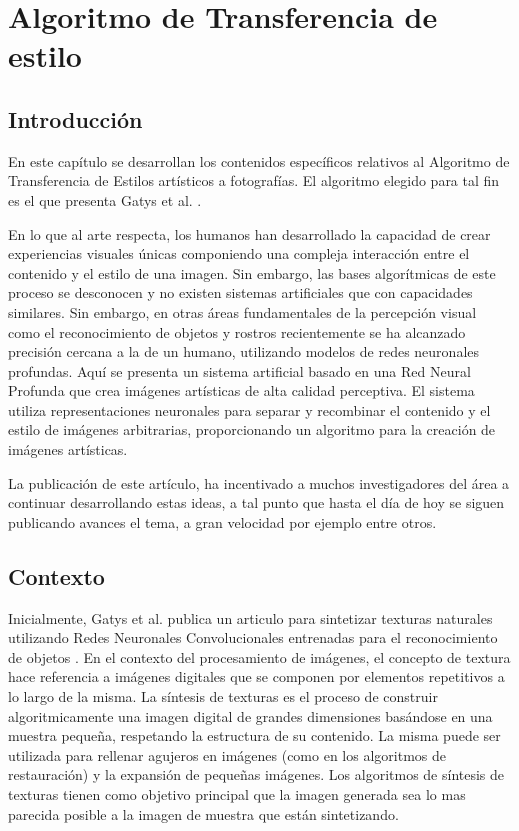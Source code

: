 \documentclass[a4paper,11pt,spanish]{book}
\begin{document}
\chapter{Algoritmo de Transferencia de estilo} \label{chapter:style_transfer}
    \section{Introducción}
      En este capítulo se desarrollan los contenidos específicos relativos al Algoritmo de Transferencia de Estilos artísticos a fotografías. 
      El algoritmo elegido para tal fin es el que presenta Gatys et al. \cite{Gatys:Neural_Style}. 
      
      En lo que al arte respecta, los humanos han desarrollado la capacidad de crear experiencias visuales únicas componiendo una compleja interacción entre el contenido y el estilo de una imagen.
      Sin embargo, las bases algorítmicas de este proceso se desconocen y no existen sistemas artificiales que con capacidades similares. Sin embargo, en otras áreas fundamentales
      de la percepción visual como el reconocimiento de objetos y rostros recientemente se ha alcanzado precisión cercana a la de un humano, utilizando modelos de redes neuronales profundas.
      Aquí se presenta un sistema artificial basado en una Red Neural Profunda que crea imágenes artísticas de alta calidad perceptiva. El sistema utiliza representaciones neuronales
      para separar y recombinar el contenido y el estilo de imágenes arbitrarias, proporcionando un algoritmo para la creación de imágenes artísticas.
      
      La publicación de este artículo, ha incentivado a muchos investigadores del área a continuar desarrollando estas ideas, a tal punto que hasta el día de hoy se siguen publicando
      avances el tema, a gran velocidad por ejemplo \cite{Johnson2016Perceptual, UlyanovVL16, luan2017deep} entre otros.


    \section{Contexto}
      Inicialmente, Gatys et al. publica un articulo para sintetizar texturas naturales utilizando Redes Neuronales Convolucionales entrenadas para el reconocimiento de 
      objetos \cite{Gatys:Texture_Synthesis}. 
      En el contexto del procesamiento de imágenes, el concepto de textura hace referencia a imágenes digitales que se componen por elementos repetitivos a lo largo de la 
      misma.
      La síntesis de texturas es el proceso de construir algoritmicamente una imagen digital de grandes dimensiones basándose en una muestra pequeña, respetando la 
      estructura de su contenido. 
      La misma puede ser utilizada para rellenar agujeros en imágenes (como en los algoritmos de restauración) y la expansión de pequeñas imágenes.
      Los algoritmos de síntesis de texturas tienen como objetivo principal que la imagen generada sea lo mas parecida posible a la imagen de muestra que están sintetizando.
     
\end{document}

